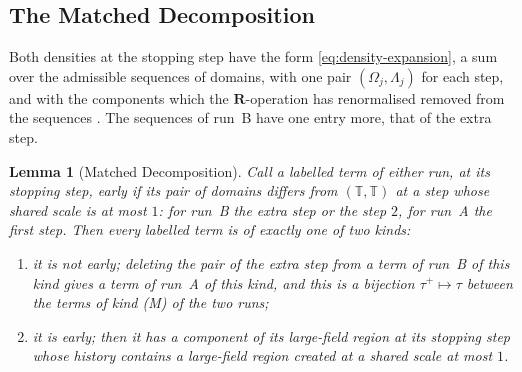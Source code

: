 \documentclass[11pt]{preprint}
\numberwithin{equation}{section}
\newtheorem{lemma}[theorem]{Lemma}
\theoremstyle{definition}
\theoremstyle{remark}
\theoremstyle{plain}
\begin{document}
\subsection{The Matched Decomposition}\label{sec:matched-decomposition}

Both densities at the stopping step have the form \eqref{eq:density-expansion}, a sum over the admissible sequences of domains, with one pair $(\Omega_j, \Lambda_j)$ for each step, and with the components which the $\mathbf R$-operation has renormalised removed from the sequences \cite[(0.3), p.~176]{BalabanLFR1}. The sequences of run~B have one entry more, that of the extra step.

\begin{lemma}[Matched Decomposition]\label{lem:matched-decomposition}
Call a labelled term of either run, at its stopping step, \emph{early} if its pair of domains differs from $(\mathbb T, \mathbb T)$ at a step whose shared scale is at most $1$: for run~B the extra step or the step $2$, for run~A the first step. Then every labelled term is of exactly one of two kinds:
\begin{enumerate}[label=(\Alph*)]
\item[(M)] it is not early; deleting the pair of the extra step from a term of run~B of this kind gives a term of run~A of this kind, and this is a bijection $\tau^+ \mapsto \tau$ between the terms of kind (M) of the two runs;
\item[(U)] it is early; then it has a component of its large-field region at its stopping step whose history contains a large-field region created at a shared scale at most $1$.
\end{enumerate}
\end{lemma}
\end{document}
